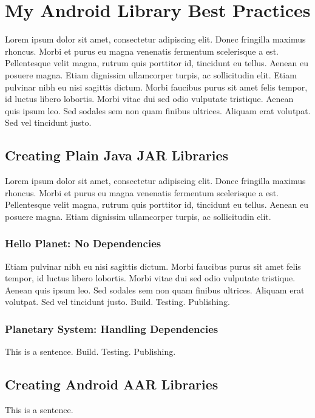 \chapter{My Android Library Best Practices}
\label{ch:bestpractices}

Lorem ipsum dolor sit amet, consectetur adipiscing elit. Donec fringilla maximus rhoncus.
Morbi et purus eu magna venenatis fermentum scelerisque a est.
Pellentesque velit magna, rutrum quis porttitor id, tincidunt eu tellus.
Aenean eu posuere magna.
Etiam dignissim ullamcorper turpis, ac sollicitudin elit.
Etiam pulvinar nibh eu nisi sagittis dictum.
Morbi faucibus purus sit amet felis tempor, id luctus libero lobortis.
Morbi vitae dui sed odio vulputate tristique.
Aenean quis ipsum leo.
Sed sodales sem non quam finibus ultrices.
Aliquam erat volutpat.
Sed vel tincidunt justo.

\section{Creating Plain Java JAR Libraries}

Lorem ipsum dolor sit amet, consectetur adipiscing elit. Donec fringilla maximus rhoncus.
Morbi et purus eu magna venenatis fermentum scelerisque a est.
Pellentesque velit magna, rutrum quis porttitor id, tincidunt eu tellus.
Aenean eu posuere magna.
Etiam dignissim ullamcorper turpis, ac sollicitudin elit.

\subsection{Hello Planet: No Dependencies}
Etiam pulvinar nibh eu nisi sagittis dictum.
Morbi faucibus purus sit amet felis tempor, id luctus libero lobortis.
Morbi vitae dui sed odio vulputate tristique.
Aenean quis ipsum leo.
Sed sodales sem non quam finibus ultrices.
Aliquam erat volutpat.
Sed vel tincidunt justo.
Build.
Testing.
Publishing.

\subsection{Planetary System: Handling Dependencies}
This is a sentence.
Build.
Testing.
Publishing.

\section{Creating Android AAR Libraries}
This is a sentence.

